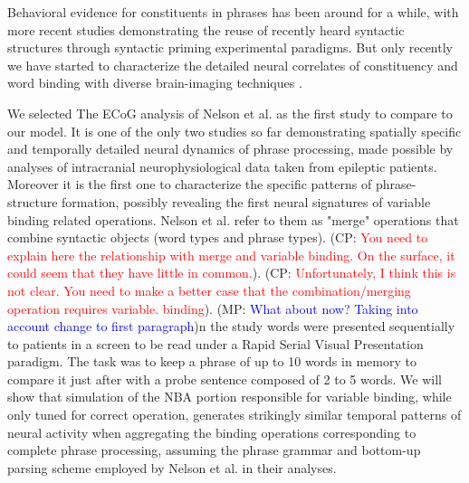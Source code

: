 \documentclass[10pt]{article}
\newcommand{\noteMP}[3]{(MP: \textcolor{blue}{#1})}
\newcommand{\noteCP}[1]{(CP: \textcolor{red}{#1})}
\begin{document}
Behavioral evidence for constituents in phrases has been around for a while\cite{bever1969underlying, abrams1969syntactic}, with more recent studies demonstrating the reuse of 
recently heard syntactic structures through syntactic priming experimental paradigms\cite{bock2007persistent, branigan2000syntactic}.
But only recently we have started to characterize the detailed neural correlates of constituency and word binding with diverse brain-imaging techniques
\cite{Nelson_2017, fedorenko2016neural, brennan2016abstract, ding2016cortical, bemis2012basic, Pallier_2011, bastiaansen2010syntactic, longe2006grammatical}.

We selected The ECoG analysis of Nelson et al.\cite{Nelson_2017} as the first study to compare to our model.
It is one of the only two studies so far demonstrating spatially specific and temporally detailed neural dynamics of phrase processing, 
made possible by analyses of intracranial neurophysiological data taken from epileptic patients.
Moreover it is the first one to characterize the specific patterns of phrase-structure formation, possibly revealing the first neural signatures of variable binding 
related operations. Nelson et al. refer to them as "merge" operations that combine syntactic objects (word types and phrase types).
\noteCP{You need to explain here the relationship with merge and variable binding. On the surface, it could seem that they have little in common.}.
\noteCP{Unfortunately, I think this is not clear. You need to make a better case that the combination/merging operation requires variable. binding}.  \noteMP{What about now? Taking into account change to first paragraph}.
In the study words were presented sequentially to patients in a screen to be read under a Rapid Serial Visual Presentation paradigm.
The task was to keep a phrase of up to 10 words in memory to compare it just after with a probe sentence composed of 2 to 5 words.
We will show that simulation of the NBA portion responsible for variable binding, while only tuned for correct operation, generates strikingly similar temporal patterns of 
neural activity when aggregating the binding operations corresponding to complete phrase processing, assuming the phrase grammar and bottom-up parsing scheme employed by 
Nelson et al. in their analyses.
\end{document}
